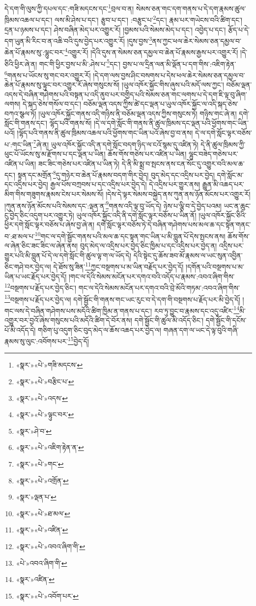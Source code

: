 དེ་དག་གི་ལུས་ཀྱི་དཔལ་དང་:གཟི་མདངས་དང་\footnote{«སྣར་»«པེ་»གཟི་མདངས་}བྲལ་བ་ན། སེམས་ཅན་གང་དག་གནས་པ་དེ་དག་རྣམས་ཚུལ་ཁྲིམས་འཆལ་པ་དང་། ལས་མི་ཤེས་པ་དང་། རྩུབ་པ་དང་། :བརྩུང་པ་\footnote{«སྣར་»«པེ་»བརྩིང་པ་}དང་། རྣམ་པར་གཡེངས་བའི་ཚིག་དང་། དྲན་པ་ཉམས་པ་དང་། ཤེས་བཞིན་མེད་པར་འགྱུར་རོ། །བྱམས་པའི་སེམས་མེད་པ་དང་། འབྱེད་པ་དང་། རྩོད་པ་དེ་དག་ཡུན་མི་རིང་བ་ན་འཆི་བའི་དུས་བྱེད་པར་འགྱུར་རོ། །དུས་བྱས་\footnote{«སྣར་»«པེ་»འདས་}ནས་ཀྱང་ཕལ་ཆེར་སེམས་ཅན་དམྱལ་བ་ཆེན་པོ་རྣམས་སུ་:ལྷུང་བར་\footnote{«སྣར་»«པེ་»ལྟུང་བར་}འགྱུར་རོ། །དེའི་དུས་ན་སེམས་ཅན་དམྱལ་བ་ཆེན་པོ་རྣམས་རྒྱས་པར་འགྱུར་རོ། །དེ་ཅིའི་ཕྱིར་ཞེ་ན། གང་གི་ཕྱིར་བྱས་པ་མི་:ཤེས་པ་\footnote{«སྣར་»ཤེ་བ་}དང་། བྱས་པ་ལ་དྲིན་ལན་མི་ལྡོན་པ་དག་གིས་:འཇིག་རྟེན་\footnote{«སྣར་»«པེ་»འཇིག་རྟེན་ན་}གནས་པ་ཡོངས་སུ་གང་བར་འགྱུར་རོ། །དེ་དག་ལས་བྱས་ཤིང་བསགས་པ་དེས་ཕལ་ཆེར་སེམས་ཅན་དམྱལ་བ་ཆེན་པོ་རྣམས་སུ་ལྟུང་བར་འགྱུར་རོ་ཞེས་གསུངས་སོ། །ཡུལ་འཁོར་སྐྱོང་གིས་ཞུས་པའི་མདོ་ལས་ཀྱང་། བཅོམ་ལྡན་འདས་དེ་བཞིན་གཤེགས་པའི་བསྟན་པ་འདི་ནུབ་པར་བགྱིད་པའི་སེམས་ཅན་གང་ལགས་པ་དེ་དག་ཇི་ལྟ་བུ་ཞིག་ལགས། དེ་སྐད་ཅེས་གསོལ་བ་དང་། བཅོམ་ལྡན་འདས་ཀྱིས་ཚེ་དང་ལྡན་པ་ཡུལ་འཁོར་སྐྱོང་ལ་འདི་སྐད་ཅེས་བཀའ་སྩལ་ཏོ། །ཡུལ་འཁོར་སྐྱོང་གནས་འདི་གཉིས་ནི་བཅོམ་ལྡན་འདས་ཀྱིས་གསུངས་ཏེ། གཉིས་གང་ཞེ་ན། དགེ་སློང་གི་གནས་དང་། ལྷོད་པའི་གནས་སོ། །དེ་ལ་དགེ་སློང་གི་གནས་ནི་ཚུལ་ཁྲིམས་དང་ལྡན་པའི་ཕྱོགས་གང་ཡིན་པའོ། །ལྷོད་པའི་གནས་ནི་ཚུལ་ཁྲིམས་འཆལ་པའི་ཕྱོགས་གང་ཡིན་པའོ་ཞེས་བྱ་བ་ནས། དེ་ལ་དགེ་སློང་ལྟར་བཅོས་པ་:གང་ཡིན་\footnote{«སྣར་»«པེ་»གང་}ཞེ་ན། ཡུལ་འཁོར་སྐྱོང་འདི་ན་དགེ་སློང་བདག་ཉིད་ལ་ངའོ་སྙམ་དུ་འཛིན་ཏེ། དེ་ནི་ཚུལ་ཁྲིམས་ཀྱི་ཕུང་པོ་ཡོངས་སུ་མ་རྫོགས་པ་དང་ལྡན་པ་ཡིན། ཆོས་གོས་གཅེས་པར་འཛིན་པ་ཡིན། ལྷུང་བཟེད་གཅེས་པར་འཛིན་པ་ཡིན། ཟང་ཟིང་གཅེས་པར་འཛིན་པ་ཡིན་ཏེ། དེ་ནི་མི་སྨྲ་བ་སྤངས་ནས་ངན་སོང་དུ་འགྱུར་བའི་མལ་ཆ་དང་། སྟན་དང་མགྲོན་\footnote{«སྣར་»«པེ་»འགྲོན་}དུ་གཉེར་བ་ཆེན་པོ་རྣམས་བདག་གིར་བྱེད། བུད་མེད་དང་འདྲིས་པར་བྱེད། དགེ་སློང་མ་དང་འདྲིས་པར་བྱེད། རྒྱལ་པོས་བཀྲབས་པ་དང་འདྲིས་པར་བྱེད་དེ། དེ་འདྲིས་པར་གྱུར་ནས། རྒྱུན་མི་འཆད་པར་མིག་གིས་གཟུགས་རྣམས་ངེས་པར་སེམས་སོ། །དེས་དེ་ལྟར་སེམས་བསྐྱེད་ནས་ཀུན་ནས་ཉོན་མོངས་པར་འགྱུར་རོ། །ཀུན་ནས་ཉོན་མོངས་པའི་སེམས་དང་:ལྡན་ན་\footnote{«སྣར་»ལྡན་པ་}གནས་འདི་ལྟ་བུ་ཡོད་དེ། ཉེས་པ་ལྕི་བ་དེ་བྱེད་པའམ། ཡང་ན་ཆུང་ངུ་བྱེད་ཅིང་འདུག་པར་འགྱུར་ཏེ། ཡུལ་འཁོར་སྐྱོང་འདི་ནི་དགེ་སློང་ལྟར་བཅོས་པ་ཡིན་ནོ། །ཡུལ་འཁོར་སྐྱོང་ཅིའི་ཕྱིར་དགེ་སློང་ལྟར་བཅོས་པ་ཞེས་བྱ་ཞེ་ན། དགེ་སློང་ལྟར་བཅོས་ཏེ་དེ་བཞིན་གཤེགས་པས་མལ་ཆ་དང་སྟན་གནང་བ་:ཐ་མལ་པ་\footnote{«སྣར་»«པེ་»ཐ་མལ་}གང་ལ་དགེ་སྦྱོང་གནས་པའི་མལ་ཆ་དང་སྟན་གང་ཡིན་པ་མི་བླུན་པོ་དེས་སྤངས་ནས། ཆོས་གོས་ལ་ཞེན་ཅིང་ཟང་ཟིང་ལ་ཞེན་ནས། བུད་མེད་ལ་འདྲིས་པར་བྱེད་ཅིང་ཁྱིམ་པ་དང་འདྲིས་པར་བྱེད་ན། འདྲིས་པར་གྱུར་པའི་མི་བླུན་པོ་དེ་ལ་དགེ་སློང་གི་ཚུལ་ལྟ་ག་ལ་ཡོད་དེ། དེའི་སྟེང་དུ་ཆོས་ཟབ་མོ་རྣམས་ལ་ཡང་སུན་འབྱིན་ཅིང་གཤེ་བར་བྱེད་ལ། དེ་ཐོས་སུ་ཟིན་\footnote{«སྣར་»«པེ་»འཛིན་}ཀྱང་བསྔགས་པ་མ་ཡིན་བརྗོད་པར་བྱེད་དོ། །དགོན་པའི་བསྔགས་པ་མ་ཡིན་པ་ཡང་རྗོད་པར་བྱེད་དོ། །གང་ལ་དེའི་སེམས་མངོན་པར་དགའ་བའི་འདོད་པ་རྣམས་:འབའ་ཞིག་གིས་\footnote{«སྣར་»«པེ་»འབའ་ཞིག་གི་}བསྔགས་པ་རྗོད་པར་བྱེད་ཅིང་། གང་ལ་དེའི་སེམས་མངོན་པར་དགའ་བའི་བྲེ་མོའི་གཏམ་:འབའ་ཞིག་གིས་\footnote{«པེ་»འབའ་ཞིག་གི་}བསྔགས་པ་རྗོད་པར་བྱེད་ལ། དགེ་སྦྱོང་གི་གནས་གང་ཡང་རུང་བ་དེ་དག་གི་བསྔགས་པ་རྗོད་པར་མི་བྱེད་དོ། །གང་ལས་དེ་བཞིན་གཤེགས་པས་མདོའི་ཚིག་ཁྱིམ་ན་གནས་པ་དང་། རབ་ཏུ་བྱུང་བ་རྣམས་དང་འདུ་འཛིར་\footnote{«སྣར་»འཛིན་}མི་འགྱུར་བར་བྱའོ་ཞེས་གསུངས་པའི་མདོའི་ཚིག་དེ་བོར་ནས། དགེ་སྦྱོང་གི་ཚུལ་མི་འདོད་ཅིང་། དགེ་སྦྱོང་གི་དངོས་པོ་མི་འདོད་དེ། གཅིག་པུ་འདུག་ཅིང་བུད་མེད་ལ་ཆོས་འཆད་པར་བྱེད་ལ། གཞན་དག་ལ་ཡང་དེ་ལྟ་བུའི་གཞི་རྣམས་སུ་ལུང་:འབོགས་པར་\footnote{«སྣར་»«པེ་»འབོག་པར་}བྱེད་དོ། 
